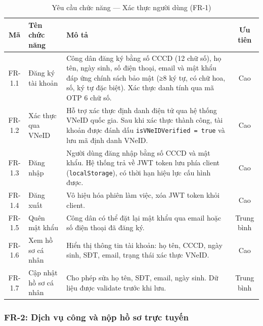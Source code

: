 \begin{table}[H]
\centering
\caption{Yêu cầu chức năng — Xác thực người dùng (FR-1)}
\label{tab:fr-auth}
\begin{tabularx}{\textwidth}{|c|l|X|c|}
\hline
\textbf{Mã} & \textbf{Tên chức năng} & \textbf{Mô tả} & \textbf{Ưu tiên} \\
\hline
FR-1.1 & Đăng ký tài khoản &
  Công dân đăng ký bằng số CCCD (12 chữ số), họ tên, ngày sinh, số điện thoại,
  email và mật khẩu đáp ứng chính sách bảo mật (≥8 ký tự, có chữ hoa, số,
  ký tự đặc biệt). Xác thực danh tính qua mã OTP 6 chữ số. &
  Cao \\
\hline
FR-1.2 & Xác thực qua VNeID &
  Hỗ trợ xác thực định danh điện tử qua hệ thống VNeID quốc gia.
  Sau khi xác thực thành công, tài khoản được đánh dấu \texttt{isVNeIDVerified = true}
  và lưu mã định danh VNeID. &
  Cao \\
\hline
FR-1.3 & Đăng nhập &
  Người dùng đăng nhập bằng số CCCD và mật khẩu. Hệ thống trả về
  JWT token lưu phía client (\texttt{localStorage}), có thời hạn hiệu lực
  cấu hình được. &
  Cao \\
\hline
FR-1.4 & Đăng xuất &
  Vô hiệu hóa phiên làm việc, xóa JWT token khỏi client. &
  Cao \\
\hline
FR-1.5 & Quên mật khẩu &
  Công dân có thể đặt lại mật khẩu qua email hoặc số điện thoại đã đăng ký. &
  Trung bình \\
\hline
FR-1.6 & Xem hồ sơ cá nhân &
  Hiển thị thông tin tài khoản: họ tên, CCCD, ngày sinh, SĐT, email,
  trạng thái xác thực VNeID. &
  Cao \\
\hline
FR-1.7 & Cập nhật hồ sơ cá nhân &
  Cho phép sửa họ tên, SĐT, email, ngày sinh. Dữ liệu được validate
  trước khi lưu. &
  Trung bình \\
\hline
\end{tabularx}
\end{table}

\subsubsection{FR-2: Dịch vụ công và nộp hồ sơ trực tuyến}

